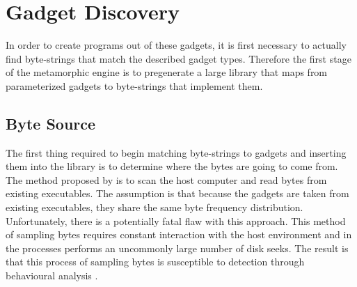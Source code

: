     \begin{table}
        \centering
        \caption[List of abstract statements.]
        {Enumeration of abstract statements and their semantic definitions. Note
        that parameters here are either variables or constants and that each
        statement has a clear correspondence with a gadget in
        Table~\ref{tab:method-gadgets}}
        \label{tab:method-statements}
    \end{table}

    \section{Gadget Discovery}

    In order to create programs out of these gadgets, it is first necessary to
    actually find byte-strings that match the described gadget types. Therefore
    the first stage of the metamorphic engine is to pregenerate a large library
    that maps from parameterized gadgets to byte-strings that implement them.

    \subsection{Byte Source}

    The first thing required to begin matching byte-strings to gadgets and
    inserting them into the library is to determine where the bytes are going to
    come from. The method proposed by \cite{franken} is to scan the host
    computer and read bytes from existing executables. The assumption is that
    because the gadgets are taken from existing executables, they share the same
    byte frequency distribution. Unfortunately, there is a potentially fatal
    flaw with this approach. This method of sampling bytes requires constant
    interaction with the host environment and in the processes performs an
    uncommonly large number of disk seeks. The result is that this process of
    sampling bytes is susceptible to detection through behavioural analysis
    \cite{anon_evade}.

